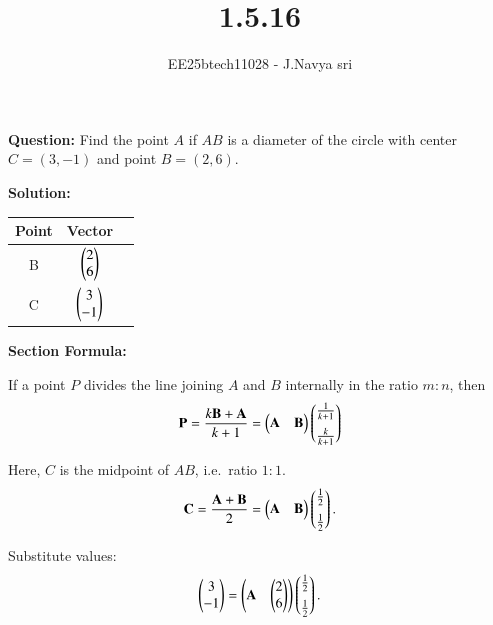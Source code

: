 \documentclass[journal]{IEEEtran}
\begin{document}

\vspace{3cm}


\title{1.5.16}
\author{EE25btech11028 - J.Navya sri}
{\let\newpage\relax\maketitle}

\renewcommand{\thefigure}{\theenumi}
\renewcommand{\thetable}{\theenumi}
\setlength{\intextsep}{10pt} %

\textbf{Question:} Find the point \(A\) if \(AB\) is a diameter of the circle with center \(C=(3,-1)\) and point \(B=(2,6)\).
\bigskip

\textbf{Solution:}
\bigskip

\begin{tabular}[12pt]{ |c| c| c|} 
    \hline
    {Point} & {Vector} \\ 
    \hline
    B & $ \begin{pmatrix}2 \\ 6\end{pmatrix} $  \\
    \hline
    C & $ \begin{pmatrix}3 \\ -1\end{pmatrix} $   \\
    \hline  
    \end{tabular}

\bigskip

\textbf{Section Formula:}

If a point \(P\) divides the line joining \(A\) and \(B\) internally in the ratio \(m:n\), then
\[
\mathbf P = \frac{k\mathbf B + \mathbf A}{k+1}
= \begin{pmatrix}\mathbf A & \mathbf B\end{pmatrix}
\begin{pmatrix}\tfrac{1}{k+1}\\[6pt]\tfrac{k}{k+1}\end{pmatrix}
\]

Here, \(C\) is the midpoint of \(AB\), i.e.\ ratio \(1:1\).
\[
\mathbf{C} = \frac{\mathbf{A}+\mathbf{B}}{2}
= \begin{pmatrix}\mathbf A & \mathbf B\end{pmatrix}
\begin{pmatrix}\tfrac{1}{2}\\[6pt]\tfrac{1}{2}\end{pmatrix}.
\]

Substitute values:
\[
\begin{pmatrix}3\\-1\end{pmatrix} =
\begin{pmatrix}\mathbf A & \begin{pmatrix}2\\6\end{pmatrix}\end{pmatrix}
\begin{pmatrix}\tfrac{1}{2}\\[6pt]\tfrac{1}{2}\end{pmatrix}.
\]
\end{document}
